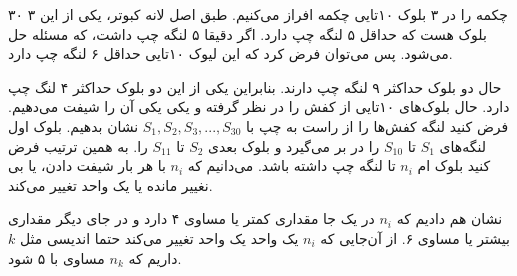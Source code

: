 	\p
۳۰ چکمه را در ۳ بلوک ۱۰تایی چکمه افراز می‌کنیم. طبق اصل لانه کبوتر، یکی از این ۳ بلوک هست که حداقل ۵ لنگه چپ دارد. اگر دقیقا ۵ لنگه چپ داشت، که مسئله حل می‌شود. پس می‌توان فرض کرد که این لیوک ۱۰تایی حداقل ۶ لنگه چپ دارد.

حال دو بلوک حداکثر ۹ لنگه چپ دارند. بنابراین یکی از این دو بلوک حداکثر ۴ لنگ  چپ دارد. حال بلوک‌های ۱۰تایی از کفش را در نظر گرفته و یکی یکی آن را شیفت می‌دهیم. فرض کنید لنگه کفش‌ها را از راست به چپ با
$S_{1}, S_{2}, S_{3}, ..., S_{30} $
نشان بدهیم.
        بلوک اول لنگه‌های 
        $S_{1}$ تا $S_{10}$
        را در بر می‌گیرد و بلوک بعدی 
        $S_{2}$ تا $S_{11}$ را. به همین ترتیب فرض کنید بلوک  ام 
        $n_{i}$ تا لنگه چپ داشته باشد.
        می‌دانیم که 
$n_{i}$ با هر بار شیفت دادن، یا بی نغییر مانده یا یک واحد تغییر می‌کند.

نشان هم دادیم که 
$n_{i}$ در یک جا مقداری کمتر یا مساوی ۴ دارد و در جای دیگر مقداری بیشتر یا مساوی ۶. از آن‌جایی که 
$n_{i}$
یک واحد یک واحد تغییر می‌کند حتما اندیسی مثل $k$ داریم که 
$n_{k}$ مساوی با ۵ شود.  